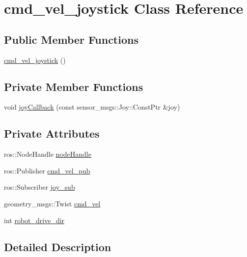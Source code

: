 \hypertarget{classcmd__vel__joystick}{\section{cmd\-\_\-vel\-\_\-joystick Class Reference}
\label{classcmd__vel__joystick}
}
\subsection*{Public Member Functions}
\begin{DoxyCompactItemize}
\item 
\hyperlink{classcmd__vel__joystick_af0e18e4b1bb5fcac03585e8ffde8e38d}{cmd\-\_\-vel\-\_\-joystick} ()
\end{DoxyCompactItemize}
\subsection*{Private Member Functions}
\begin{DoxyCompactItemize}
\item 
void \hyperlink{classcmd__vel__joystick_a22571f85861dfa5631f68b8e8e6d0497}{joy\-Callback} (const sensor\-\_\-msgs\-::\-Joy\-::\-Const\-Ptr \&joy)
\end{DoxyCompactItemize}
\subsection*{Private Attributes}
\begin{DoxyCompactItemize}
\item 
ros\-::\-Node\-Handle \hyperlink{classcmd__vel__joystick_ae50ce40991b7bfff45a21adbfc028465}{node\-Handle}
\item 
ros\-::\-Publisher \hyperlink{classcmd__vel__joystick_a8c089e3c358de60bd10ab17a2553dc44}{cmd\-\_\-vel\-\_\-pub}
\item 
ros\-::\-Subscriber \hyperlink{classcmd__vel__joystick_a2947a21136647b829b50058c0ced8b01}{joy\-\_\-sub}
\item 
geometry\-\_\-msgs\-::\-Twist \hyperlink{classcmd__vel__joystick_a8f909c2268739f4aad576786c8876576}{cmd\-\_\-vel}
\item 
int \hyperlink{classcmd__vel__joystick_a24f26021bde377287c5790dc5f734cc5}{robot\-\_\-drive\-\_\-dir}
\end{DoxyCompactItemize}


\subsection{Detailed Description}


